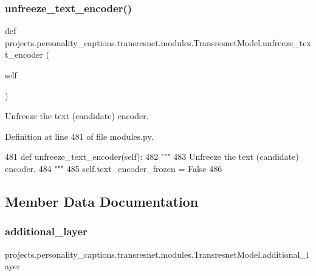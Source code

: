 \subsubsection{\texorpdfstring{unfreeze\+\_\+text\+\_\+encoder()}{unfreeze\_text\_encoder()}}
{\footnotesize\ttfamily def projects.\+personality\+\_\+captions.\+transresnet.\+modules.\+Transresnet\+Model.\+unfreeze\+\_\+text\+\_\+encoder (\begin{DoxyParamCaption}\item[{}]{self }\end{DoxyParamCaption})}

\begin{DoxyVerb}Unfreeze the text (candidate) encoder.
\end{DoxyVerb}
 

Definition at line 481 of file modules.\+py.


\begin{DoxyCode}
481     \textcolor{keyword}{def }unfreeze\_text\_encoder(self):
482         \textcolor{stringliteral}{"""}
483 \textcolor{stringliteral}{        Unfreeze the text (candidate) encoder.}
484 \textcolor{stringliteral}{        """}
485         self.text\_encoder\_frozen = \textcolor{keyword}{False}
486 
\end{DoxyCode}


\subsection{Member Data Documentation}
\mbox{\label{classprojects_1_1personality__captions_1_1transresnet_1_1modules_1_1TransresnetModel_a3f25e3353c49c641266546dfd7bb086a}} 
\subsubsection{\texorpdfstring{additional\+\_\+layer}{additional\_layer}}
{\footnotesize\ttfamily projects.\+personality\+\_\+captions.\+transresnet.\+modules.\+Transresnet\+Model.\+additional\+\_\+layer}



